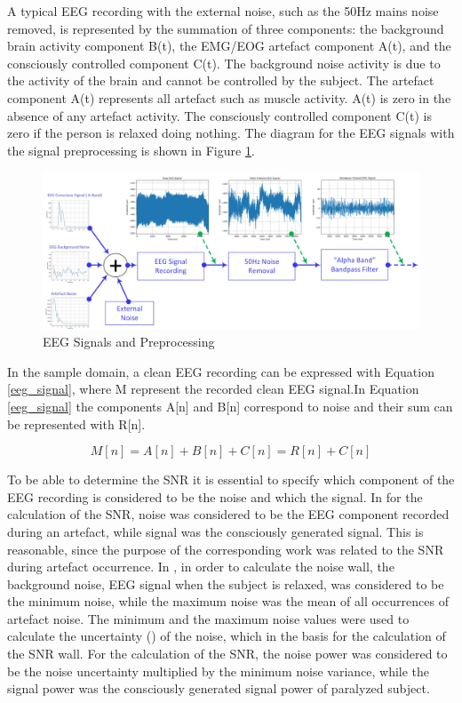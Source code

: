 A typical EEG recording with the external noise, such as the 50Hz mains noise removed, is represented by the summation of three components: the background brain activity component B(t), the EMG/EOG artefact component A(t), and the consciously controlled component C(t).   The background noise activity is due to the activity of the brain and cannot be controlled by the subject. The artefact component A(t) represents all artefact such as muscle activity. A(t) is zero in the absence of any artefact activity. The consciously controlled component C(t) is zero if the person is relaxed doing nothing. The diagram for the EEG signals with the signal preprocessing is shown in Figure \ref{EEGsignals}.

\begin{figure}[hbt!]
	\centering
	\includegraphics[width=\linewidth]{Figures/EEGsignals.jpg} 
	\caption{EEG Signals and Preprocessing} 
	\label{EEGsignals} 
\end{figure}





 In the sample domain, a clean EEG recording can be expressed with Equation \ref{eeg_signal}, where M represent the recorded clean EEG signal.In   Equation  \ref{eeg_signal} the components A[n] and B[n] correspond to noise and their sum can be represented with R[n]. 

\begin{equation}
M[n]=A[n]+B[n]+C[n] = R[n]+C[n]
\label{eeg_signal}
\end{equation}


To be able to determine the SNR it is essential to specify which component of the EEG recording is considered to be the noise and which the signal. In \citep{Repovs2010} for the calculation of the SNR, noise was considered to be the EEG component recorded during an artefact, while signal was the consciously generated signal. This is reasonable, since the purpose of the corresponding work was related to the SNR during artefact occurrence. In \citep{Porr2018}, in order to calculate the noise wall, the background noise, EEG signal when the subject is relaxed, was considered to be the minimum noise, while the maximum noise was the mean of all occurrences of artefact noise. The minimum and the maximum noise values were used to calculate the uncertainty (\textrho) of the noise, which in the basis for the calculation of the SNR wall. For the calculation of the SNR, the noise power was considered to be the noise uncertainty multiplied by the minimum noise variance, while the signal power was the consciously generated signal power of paralyzed subject.

